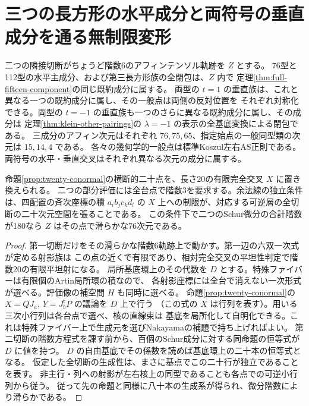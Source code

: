 \section{三つの長方形の水平成分と両符号の垂直成分を通る無制限変形}
\label{sec:rectangle-unrestricted-components}
\begin{theorem}\label{thm:rectangle-unrestricted-components}
二つの隣接切断がちょうど階数6のアフィンテンソル軌跡を $Z$ とする。
76型と112型の水平主成分、および第三長方形族の全閉包は、$Z$ 内で
定理\ref{thm:full-fifteen-component}の同じ既約成分に属する。
両型の $t=1$ の垂直族は、これと異なる一つの既約成分に属し、その一般点は両側の反対位置を
それぞれ対称化できる。両型の $t=-1$ の垂直族も一つのさらに異なる既約成分に属し、その成分は
定理\ref{thm:klein-other-pairings}の $\lambda=-1$ の表示の全基底変換による閉包である。
三成分のアフィン次元はそれぞれ $76,75,65$、指定始点の一般同型類の次元は $15,14,4$ である。
各々の幾何学的一般点は標準Koszul左右AS正則である。両符号の水平・垂直交叉はそれぞれ異なる次元の成分に属する。
\end{theorem}

\begin{lemma}\label{lem:finite-flat-conormals}
命題\ref{prop:twenty-conormal}の横断的二十点を、長さ20の有限完全交叉 $X$ に置き換えられる。
二つの部分評価には全台点で階数3を要求する。余法線の独立条件は、四配置の斉次座標の積
$a_i b_j c_k d_l$ の $X$ 上への制限が、対応する可逆層の全切断の二十次元空間を張ることである。
この条件下で二つのSchur微分の合計階数が180なら $Z$ はその点で滑らかな76次元である。
\end{lemma}
\begin{proof}
第一切断だけをその滑らかな階数6軌跡上で動かす。第一辺の六双一次式が定める射影族は
この点の近くで有限であり、相対完全交叉の平坦性判定で階数20の有限平坦射になる。
局所基底環上のその代数を $D$ とする。特殊ファイバーは有限個のArtin局所環の積なので、
各射影座標には全台で消えない一次形式が選べる。評価像の補空間 $H$ も同時に選べる。
命題\ref{prop:twenty-conormal}の $X=QJ_a$, $Y=J_b^{\mathsf t}P$ の議論を $D$ 上で行う
（この式の $X$ は行列を表す）。用いる三次小行列は各台点で選べ、核の直線束は
基底を局所化して自明化できる。これは特殊ファイバー上で生成元を選びNakayamaの補題で持ち上げればよい。
第二切断の階数方程式を課す前から、百個のSchur成分に対する同命題の恒等式が $D$ に値を持つ。
$D$ の自由基底でその係数を読めば基底環上の二十本の恒等式となる。
仮定した全切断の生成性は、まさに基点でこの二十行が独立であることを表す。
非主行・列への射影が左右核上の同型であることも各点での可逆小行列から従う。
従って先の命題と同様に八十本の生成系が得られ、微分階数により滑らかである。
\end{proof}

